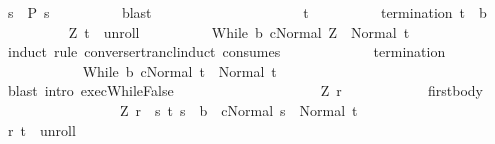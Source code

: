 \begin{isabellebody}
\ {\isachardoublequoteopen}s\ {\isasymin}\ {\isacharquery}P{\isacharprime}\ s{\isachardoublequoteclose}\isanewline
\ \ \ \ \ \ \ \ \isamarkupfalse%
\ blast\isanewline
\ \ \ \ \isamarkupfalse%
\isanewline
\ \ \ \ \ \ \isacommand{{\isacharbraceleft}}\isamarkupfalse%
\isanewline
\ \ \ \ \ \ \ \ \isamarkupfalse%
\ t\isanewline
\ \ \ \ \ \ \ \ \isamarkupfalse%
\ {\isachardoublequoteopen}termination{\isachardoublequoteclose}{\isacharcolon}\ {\isachardoublequoteopen}t\ {\isasymnotin}\ b{\isachardoublequoteclose}\isanewline
\ \ \ \ \ \ \ \ \isamarkupfalse%
\ {\isachardoublequoteopen}{\isacharparenleft}Z{\isacharcomma}\ t{\isacharparenright}\ {\isasymin}\ {\isacharquery}unroll{\isachardoublequoteclose}\isanewline
\ \ \ \ \ \ \ \ \isamarkupfalse%
\ {\isachardoublequoteopen}{\isasymGamma}{\isasymturnstile}{\isasymlangle}While\ b\ c{\isacharcomma}Normal\ Z{\isasymrangle}\ {\isasymRightarrow}\ Normal\ t{\isachardoublequoteclose}\isanewline
\ \ \ \ \ \ \ \ \isamarkupfalse%
\ {\isacharparenleft}induct\ rule{\isacharcolon}\ converse{\isacharunderscore}rtrancl{\isacharunderscore}induct\ {\isacharbrackleft}consumes\ {}{\isacharbrackright}{\isacharparenright}\isanewline
\ \ \ \ \ \ \ \ \ \ \isamarkupfalse%
\ {\isachardoublequoteopen}termination{\isachardoublequoteclose}\ \isanewline
\ \ \ \ \ \ \ \ \ \ \isamarkupfalse%
\ {\isachardoublequoteopen}{\isasymGamma}{\isasymturnstile}{\isasymlangle}While\ b\ c{\isacharcomma}Normal\ t{\isasymrangle}\ {\isasymRightarrow}\ Normal\ t{\isachardoublequoteclose}\isanewline
\ \ \ \ \ \ \ \ \ \ \ \ \isamarkupfalse%
\ {\isacharparenleft}blast\ intro{\isacharcolon}\ exec{\isachardot}WhileFalse{\isacharparenright}\isanewline
\ \ \ \ \ \ \ \ \isamarkupfalse%
\isanewline
\ \ \ \ \ \ \ \ \ \ \isamarkupfalse%
\ Z\ r\isanewline
\ \ \ \ \ \ \ \ \ \ \isamarkupfalse%
\ first{\isacharunderscore}body{\isacharcolon}\ \isanewline
\ \ \ \ \ \ \ \ \ \ \ \ \ \ \ \ \ {\isachardoublequoteopen}{\isacharparenleft}Z{\isacharcomma}\ r{\isacharparenright}\ {\isasymin}\ {\isacharbraceleft}{\isacharparenleft}s{\isacharcomma}\ t{\isacharparenright}{\isachardot}\ s\ {\isasymin}\ b\ {\isasymand}\ {\isasymGamma}{\isasymturnstile}{\isasymlangle}c{\isacharcomma}Normal\ s{\isasymrangle}\ {\isasymRightarrow}\ Normal\ t{\isacharbraceright}{\isachardoublequoteclose}\isanewline
\ \ \ \ \ \ \ \ \ \ \isamarkupfalse%
\ {\isachardoublequoteopen}{\isacharparenleft}r{\isacharcomma}\ t{\isacharparenright}\ {\isasymin}\ {\isacharquery}unroll{\isachardoublequoteclose}\isanewline

\end{isabellebody}

